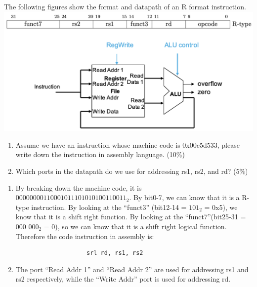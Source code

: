 \documentclass[12pt, a4paper]{article}
\begin{document}
\pagebreak
\begin{q}{15}
The following figures show the format and datapath of an R format instruction.
\centering\includegraphics[scale=0.65]{q5.png}
\begin{enumerate}
    \item Assume we have an instruction whose machine code is 0x00c5d533, please write
    down the instruction in assembly language. (10\%)
    \item Which ports in the datapath do we use for addressing rs1, rs2, and rd? (5\%)
\end{enumerate}
\end{q}
\begin{ans}
    \begin{enumerate}
        \item By breaking down the machine code, it is \texttt{$0000 0000 1100 0101 1101 0101 0011 0011_2$}. By bit0-7, we can know that it is a R-type instruction. By looking at the ``funct3'' (bit12-14 = $101_2$ = 0x5), we know that it is a
                shift right function. By looking at the ``funct7''(bit25-31 = 000 000$_2$ = 0), so we can know that it is a shift right logical function. Therefore the code instruction in assembly is:
                \begin{verbatim}
                    srl rd, rs1, rs2
                \end{verbatim}
        \item The port ``Read Addr 1'' and ``Read Addr 2'' are used for addressing rs1 and rs2 respectively, while the ``Write Addr'' port is used for addressing rd.
    \end{enumerate}
\end{ans}
\pagebreak
\end{document}
